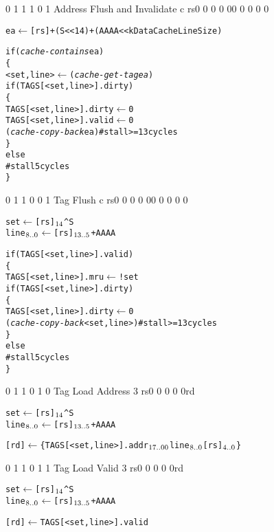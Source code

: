      {0 1 1 1 0 1} {Address Flush and Invalidate} {c} {\RawTag} {rs}{0 0 0 0 0}{0 0 0 0 0}
\begin{alltt}
         ea \(\leftarrow\) [rs] + (S << 14) + (AAAA << kDataCacheLineSize)

         if ({\em{cache-contains}} ea)
         \{
           <set,line> \(\leftarrow\) ({\em{cache-get-tag} ea})
           if (TAGS[<set,line>].dirty) 
           \{
              TAGS[<set,line>].dirty \(\leftarrow\) 0
              TAGS[<set,line>].valid \(\leftarrow\) 0
              ({\em{cache-copy-back}} ea)    \# stall >= 13 cycles
           \}
           else
              \# stall 5 cycles
         \}
\end{alltt}\rawInstrEnd

     {0 1 1 0 0 1} {Tag Flush} {c} {\RawTag} {rs}{0 0 0 0 0}{0 0 0 0 0}
\begin{alltt}
         set \hspace{1mm}    \(\leftarrow\) [rs]\({\sb{14}}\) ^ S
         line\({\sb{8..0}}\)  \(\leftarrow\) [rs]\({\sb{13..5}}\) + AAAA

         if (TAGS[<set,line>].valid)
         \{
           TAGS[<set,line>].mru \(\leftarrow\) !set
           if (TAGS[<set,line>].dirty) 
           \{
              TAGS[<set,line>].dirty \(\leftarrow\) 0
              ({\em{cache-copy-back}} <set,line>)    \# stall >= 13 cycles
           \}
           else
              \# stall 5 cycles
         \}
\end{alltt}\rawInstrEnd


     {0 1 1 0 1 0} {Tag Load Address} {3} {\RawTag} {rs}{0 0 0 0 0}{rd}
\begin{alltt}
         set \hspace{1mm}    \(\leftarrow\) [rs]\({\sb{14}}\) ^ S
         line\({\sb{8..0}}\)  \(\leftarrow\) [rs]\({\sb{13..5}}\) + AAAA

         [rd] \(\leftarrow\) \{ TAGS[<set,line>].addr\({\sb{17..00}}\) line\({\sb{8..0}}\) [rs]\({\sb{4..0}}\) \}
\end{alltt}\rawInstrEnd

     {0 1 1 0 1 1} {Tag Load Valid} {3} {\RawTag} {rs}{0 0 0 0 0}{rd}
\begin{alltt}
         set \hspace{1mm}   \(\leftarrow\) [rs]\({\sb{14}}\) ^ S
         line\({\sb{8..0}}\) \(\leftarrow\) [rs]\({\sb{13..5}}\) + AAAA

         [rd] \(\leftarrow\) TAGS[<set,line>].valid
\end{alltt}\rawInstrEnd

